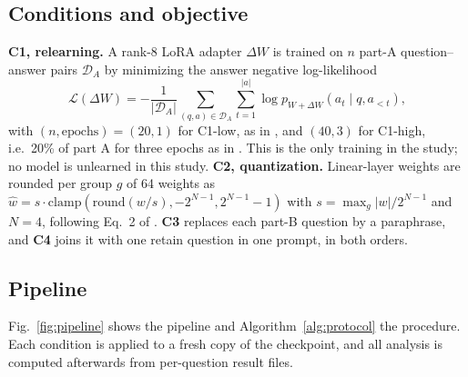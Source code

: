 \documentclass[conference]{IEEEtran}
\begin{document}
\subsection{Conditions and objective}
\textbf{C1, relearning.} A rank-8 LoRA adapter $\Delta W$ is trained on $n$ part-A question--answer pairs $\mathcal{D}_A$ by minimizing the answer negative log-likelihood
\begin{equation}
\mathcal{L}(\Delta W)=-\frac{1}{|\mathcal{D}_A|}\sum_{(q,a)\in\mathcal{D}_A}\sum_{t=1}^{|a|}\log p_{W+\Delta W}(a_t\mid q,a_{<t}),\label{eq:lora}
\end{equation}
with $(n,\text{epochs})=(20,1)$ for C1-low, as in \cite{fan2025sam}, and $(40,3)$ for C1-high, i.e.\ 20\% of part A for three epochs as in \cite{fan2025simnpo}. This is the only training in the study; no model is unlearned in this study.
\textbf{C2, quantization.} Linear-layer weights are rounded per group $g$ of 64 weights as $\hat w=s\cdot\mathrm{clamp}(\mathrm{round}(w/s),-2^{N-1},2^{N-1}-1)$ with $s=\max_{g}|w|/2^{N-1}$ and $N=4$, following Eq.~2 of \cite{zhang2025quant}.
\textbf{C3} replaces each part-B question by a paraphrase, and \textbf{C4} joins it with one retain question in one prompt, in both orders.

\subsection{Pipeline}
Fig.~\ref{fig:pipeline} shows the pipeline and Algorithm~\ref{alg:protocol} the procedure. Each condition is applied to a fresh copy of the checkpoint, and all analysis is computed afterwards from per-question result files.
\end{document}
